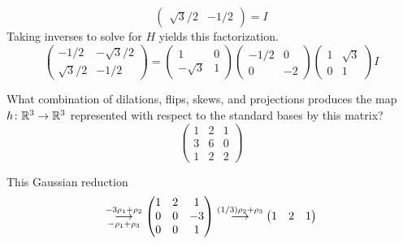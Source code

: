 \begin{exercises}
\begin{answer}
\begin{equation*}
\begin{pmatrix}
              \sqrt{3}/2  &-1/2
            \end{pmatrix}
            =I
          \end{equation*}
          Taking inverses to solve for $H$ yields this factorization.
          \begin{equation*}
            \begin{pmatrix}
              -1/2        &-\sqrt{3}/2  \\
              \sqrt{3}/2  &-1/2
            \end{pmatrix}
            =
            \begin{pmatrix}
                1         &0  \\
               -\sqrt{3}  &1
            \end{pmatrix}
            \begin{pmatrix}
              -1/2  &0    \\
               0    &-2
            \end{pmatrix}
            \begin{pmatrix}
              1  &\sqrt{3}  \\
              0  &1
            \end{pmatrix}
            I
          \end{equation*}
    \end{answer}
  \item 
    What combination of dilations, flips, skews, and projections
    produces the map $\map{h}{\Re^3}{\Re^3}$ 
    represented with respect to the standard bases by this matrix?
    \begin{equation*}
      \begin{pmatrix}
        1  &2  &1  \\
        3  &6  &0  \\
        1  &2  &2
      \end{pmatrix}
    \end{equation*}
    \begin{answer}
      This Gaussian reduction
      \begin{equation*}
        \grstep[-\rho_1+\rho_3]{-3\rho_1+\rho_2}
        \begin{pmatrix}
          1  &2  &1  \\
          0  &0  &-3 \\
          0  &0  &1
        \end{pmatrix}
        \grstep{(1/3)\rho_2+\rho_3}
        \begin{pmatrix}
          1  &2  &1  \\

\end{pmatrix}
\end{equation*}
\end{answer}
\end{exercises}
